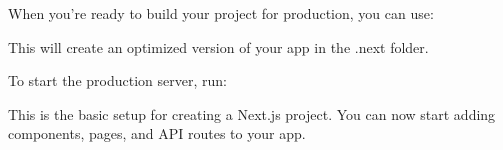 
When you're ready to build your project for production, you can use:



This will create an optimized version of your app in the .next folder.


To start the production server, run:


This is the basic setup for creating a Next.js project. You can now start adding components, pages, and API routes to your app.